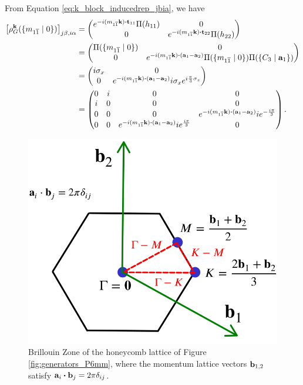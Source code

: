 \begin{itemize}
From Equation \ref{eq:k_block_inducedrep_jbia}, we have
\begin{align} \label{eq:rho_m11_inducedrep_k_jbia}
\qty[\rho_G^\k(\{m_{1\cc{1}}\mid0\})]_{j\beta,i\alpha} &=
\begin{pmatrix}
e^{-i(m_{1\cc{1}} \k) \vdot \t_{11}} \Pi(h_{11}) & 0 \\
0 & e^{-i(m_{1\cc{1}} \k) \vdot \t_{22}} \Pi(h_{22})
\end{pmatrix} \\
&=
\begin{pmatrix}
\Pi(\{m_{1\cc{1}}\mid0\}) & 0 \\
0 & e^{-i(m_{1\cc{1}} \k) \vdot (\a_1-\a_2)} \Pi(\{m_{1\cc{1}}\mid0\}) \Pi(\{C_3\mid \a_1\})
\end{pmatrix} \\
&=
\begin{pmatrix}
i \sigma_x & 0 \\
0 & e^{-i(m_{1\cc{1}} \k) \vdot (\a_1-\a_2)} i \sigma_x e^{i\frac{\pi}{3}\sigma_z}
\end{pmatrix} \\
&=
\begin{pmatrix}
0 & i & 0 & 0 \\
i & 0 & 0 & 0 \\
0 & 0 & 0 & e^{-i(m_{1\cc{1}} \k) \vdot (\a_1-\a_2)} i e^{-\frac{i\pi}{3}} \\
0 & 0 & e^{-i(m_{1\cc{1}} \k) \vdot (\a_1-\a_2)} i e^{ \frac{i\pi}{3}} & 0 \\
\end{pmatrix}.
\end{align}

\end{itemize}

\begin{figure}[H]
\centering
\includegraphics[width=0.6\linewidth]{fig/honeycomb_tqc_BZ.png}
\caption{Brillouin Zone of the honeycomb lattice of Figure \ref{fig:generators_P6mm}, where the momentum lattice vectors ${\vb{b}}_{1,2}$ satisfy $\vb{a}_i \vdot \vb{b}_j = 2\pi \delta_{ij}$.}
\label{fig:honeycomb_tqc_BZ}
\end{figure}


